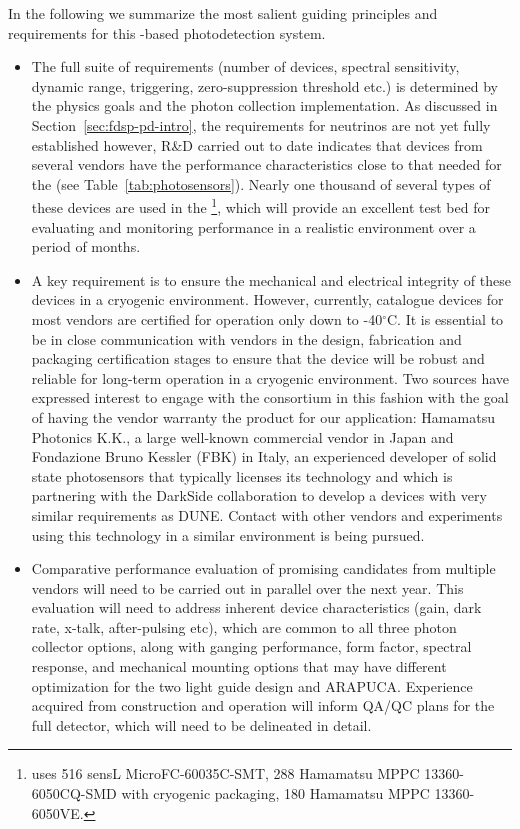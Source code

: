 In the following we summarize the most salient guiding principles and requirements for this -based photodetection system.

\begin{itemize}

\item  The full suite of  requirements (number of devices, spectral sensitivity, dynamic range, triggering, 
zero-suppression threshold etc.) is determined by the physics goals and the photon collection implementation.  As discussed in Section~\ref{sec:fdsp-pd-intro},  the requirements for  neutrinos are not yet fully established however, 
R\&D carried out to date indicates that devices from several vendors have the 
performance characteristics close to that needed for the  (see Table~\ref{tab:photosensors}). 
Nearly one thousand of several types of these devices are used in the  \footnote{  uses 516 sensL MicroFC-60035C-SMT, 288 Hamamatsu MPPC 13360-6050CQ-SMD with cryogenic packaging, 180 Hamamatsu MPPC 13360-6050VE.}, which will provide an excellent test bed for evaluating and monitoring 
performance in a realistic environment over a period of months.

\item A key requirement is to ensure the mechanical and electrical integrity of these devices in a cryogenic environment. However, currently, catalogue devices for most vendors are certified for operation only down to -40$^\circ$C. It is essential to be in close communication with  vendors in the design, fabrication and  packaging certification stages to ensure that the device will be robust and reliable for long-term operation in a cryogenic environment. 
Two sources have expressed interest to engage with the consortium in this fashion with the goal of having the vendor warranty the product for our application: Hamamatsu Photonics K.K., a large well-known commercial vendor in Japan and Fondazione Bruno Kessler (FBK) in Italy, an experienced developer of solid state photosensors that typically licenses its technology and which is partnering with the DarkSide collaboration to develop a devices with very similar requirements as DUNE. 
Contact with other vendors and experiments using this technology in a similar environment is being pursued. 

\item Comparative performance evaluation of promising  candidates from
multiple vendors will need to be carried out in parallel over the next year. This evaluation will need to
address inherent device characteristics (gain, dark rate, x-talk, after-pulsing etc), which are common to all three photon collector options, along with ganging performance, form factor, spectral response, and mechanical mounting options that may have different optimization for the two light guide design and ARAPUCA.
Experience acquired from  construction and operation will inform QA/QC plans for the full detector, which will need to be delineated in detail.


\end{itemize}
